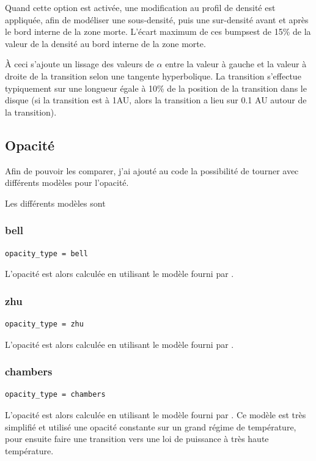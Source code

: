 Quand cette option est activée, une modification au profil de densité est appliquée, afin de modéliser une sous-densité, puis une sur-densité avant et après le bord interne de la zone morte. L'écart maximum de ces \og bumps\fg est de 15\% de la valeur de la densité au bord interne de la zone morte. 

À ceci s'ajoute un lissage des valeurs de $\alpha$ entre la valeur à gauche et la valeur à droite de la transition selon une tangente hyperbolique. La transition s'effectue typiquement sur une longueur égale à 10\% de la position de la transition dans le disque (si la transition est à 1AU, alors la transition a lieu sur 0.1 AU autour de la transition).

\subsection{Opacité}
Afin de pouvoir les comparer, j'ai ajouté au code la possibilité de tourner avec différents modèles pour l'opacité. 

Les différents modèles sont \citep{bell1994FU, zhu2009nonsteady, chambers2009analytic, hure2000transition}

\subsubsection{bell}
\begin{verbatim}
opacity_type = bell
\end{verbatim}

L'opacité est alors calculée en utilisant le modèle fourni par \cite{bell1994FU}. 

\subsubsection{zhu}
\begin{verbatim}
opacity_type = zhu
\end{verbatim}

L'opacité est alors calculée en utilisant le modèle fourni par \cite{zhu2009nonsteady}. 

\subsubsection{chambers}
\begin{verbatim}
opacity_type = chambers
\end{verbatim}

L'opacité est alors calculée en utilisant le modèle fourni par \cite{chambers2009analytic}. Ce modèle est très simplifié et utilisé une opacité constante sur un grand régime de température, pour ensuite faire une transition vers une loi de puissance à très haute température.

